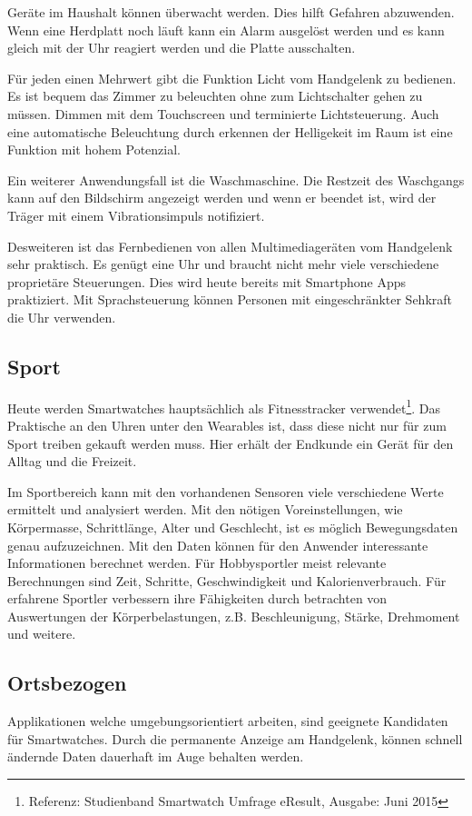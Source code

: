 Geräte im Haushalt können überwacht werden. Dies hilft Gefahren abzuwenden. Wenn eine Herdplatt noch läuft kann ein Alarm ausgelöst werden und es kann gleich mit der Uhr reagiert werden und die Platte ausschalten.

Für jeden einen Mehrwert gibt die Funktion Licht vom Handgelenk zu bedienen. Es ist bequem das Zimmer zu beleuchten ohne zum Lichtschalter gehen zu müssen. Dimmen mit dem Touchscreen und terminierte Lichtsteuerung. Auch eine automatische Beleuchtung durch erkennen der Helligekeit im Raum ist eine Funktion mit hohem Potenzial.

Ein weiterer Anwendungsfall ist die Waschmaschine. Die Restzeit des Waschgangs kann auf den Bildschirm angezeigt werden und wenn er beendet ist, wird der Träger mit einem Vibrationsimpuls notifiziert.

Desweiteren ist das Fernbedienen von allen Multimediageräten vom Handgelenk sehr praktisch. Es genügt eine Uhr und braucht nicht mehr viele verschiedene proprietäre Steuerungen. Dies wird heute bereits mit Smartphone Apps praktiziert. Mit Sprachsteuerung können Personen mit eingeschränkter Sehkraft die Uhr verwenden.

\subsection{Sport}
Heute werden Smartwatches hauptsächlich als Fitnesstracker verwendet\footnote{Referenz: Studienband Smartwatch Umfrage eResult, Ausgabe: Juni 2015}. Das Praktische an den Uhren unter den Wearables ist, dass diese nicht nur für zum Sport treiben gekauft werden muss. Hier erhält der Endkunde ein Gerät für den Alltag und die Freizeit.

Im Sportbereich kann mit den vorhandenen Sensoren viele verschiedene Werte ermittelt und analysiert werden. Mit den nötigen Voreinstellungen, wie Körpermasse, Schrittlänge, Alter und Geschlecht, ist es möglich Bewegungsdaten genau aufzuzeichnen. Mit den Daten können für den Anwender interessante Informationen berechnet werden. Für Hobbysportler meist relevante Berechnungen sind Zeit, Schritte, Geschwindigkeit und Kalorienverbrauch. Für erfahrene Sportler verbessern ihre Fähigkeiten durch betrachten von Auswertungen der Körperbelastungen, z.B. Beschleunigung, Stärke, Drehmoment und weitere.

\subsection{Ortsbezogen}
Applikationen welche umgebungsorientiert arbeiten, sind geeignete Kandidaten für Smartwatches. Durch die permanente Anzeige am Handgelenk, können schnell ändernde Daten dauerhaft im Auge behalten werden.

